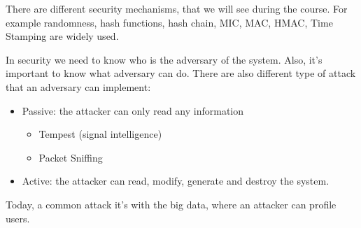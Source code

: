 There are different security mechanisms, that we will see during the course.
For example randomness, hash functions, hash chain, MIC, MAC, HMAC, Time
Stamping are widely used.

In security we need to know who is the adversary of the system. Also, it's
important to know what adversary can do. There are also different type of
attack that an adversary can implement:
\begin{itemize}
  \item Passive: the attacker can only read any information
  \begin{itemize}
    \item Tempest (signal intelligence)
    \item Packet Sniffing
  \end{itemize}
  \item Active: the attacker can read, modify, generate and destroy the system.
\end{itemize}

Today, a common attack it's with the big data, where an attacker can
profile users.
